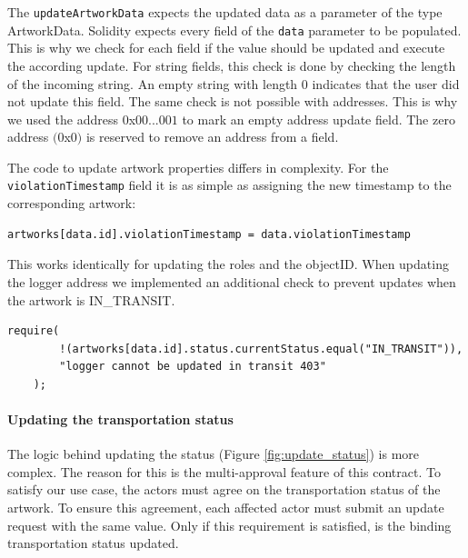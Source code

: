 

The \texttt{updateArtworkData} expects the updated data as a parameter of the type ArtworkData. Solidity expects every field of the \texttt{data} parameter to be populated. This is why we check for each field if the value should be updated and execute the according update. For string fields, this check is done by checking the length of the incoming string. An empty string with length $0$ indicates that the user did not update this field. The same check is not possible with addresses. This is why we used the address $0$x$00...001$ to mark an empty address update field. The zero address $(0$x$0)$ is reserved to remove an address from a field.

The code to update artwork properties differs in complexity. For the \texttt{violationTimestamp} field it is as simple as assigning the new timestamp to the corresponding artwork: 
\begin{lstlisting}[language=Solidity]
    artworks[data.id].violationTimestamp = data.violationTimestamp
\end{lstlisting}
This works identically for updating the roles and the objectID. When updating the logger address we implemented an additional check to prevent updates when the artwork is IN\_TRANSIT.
\begin{lstlisting}[language=Solidity]
    require(
        !(artworks[data.id].status.currentStatus.equal("IN_TRANSIT")),
        "logger cannot be updated in transit 403"
    );
\end{lstlisting}

\paragraph{Updating the transportation status}
\label{sec:update_status}
The logic behind updating the status (Figure \ref{fig:update_status}) is more complex. The reason for this is the multi-approval feature of this contract. To satisfy our use case, the actors must agree on the transportation status of the artwork. To ensure this agreement, each affected actor must submit an update request with the same value. Only if this requirement is satisfied, is the binding transportation status updated. 

